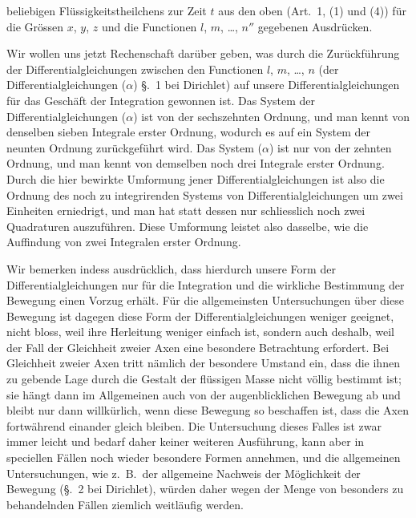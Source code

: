 \documentclass[12pt,a4paper]{article}
\begin{document}
beliebigen Fl\"ussigkeitstheilchens zur Zeit $t$ aus den oben (Art.~1, (1) und (4)) f\"ur die Gr\"ossen $x$, $y$, $z$ und die Functionen $l$, $m$, \dots, $n''$ gegebenen Ausdr\"ucken.

Wir wollen uns jetzt Rechenschaft dar\"uber geben, was durch die Zur\"uckf\"uhrung der Differentialgleichungen zwischen den Functionen $l$, $m$, \dots, $n$ (der Differentialgleichungen ($\alpha$) \S.~1 bei Dirichlet) auf unsere Differentialgleichungen f\"ur das Gesch\"aft der Integration gewonnen ist. Das System der Differentialgleichungen ($\alpha$) ist von der sechszehnten Ordnung, und man kennt von denselben sieben Integrale erster Ordnung, wodurch es auf ein System der neunten Ordnung zur\"uckgef\"uhrt wird. Das System ($\alpha$) ist nur von der zehnten Ordnung, und man kennt von demselben noch drei Integrale erster Ordnung. Durch die hier bewirkte Umformung jener Differentialgleichungen ist also die Ordnung des noch zu integrirenden Systems von Differentialgleichungen um zwei Einheiten erniedrigt, und man hat statt dessen nur schliesslich noch zwei Quadraturen auszuf\"uhren. Diese Umformung leistet also dasselbe, wie die Auffindung von zwei Integralen erster Ordnung.

Wir bemerken indess ausdr\"ucklich, dass hierdurch unsere Form der Differentialgleichungen nur f\"ur die Integration und die wirkliche Bestimmung der Bewegung einen Vorzug erh\"alt. F\"ur die allgemeinsten Untersuchungen \"uber diese Bewegung ist dagegen diese Form der Differentialgleichungen weniger geeignet, nicht bloss, weil ihre Herleitung weniger einfach ist, sondern auch deshalb, weil der Fall der Gleichheit zweier Axen eine besondere Betrachtung erfordert. Bei Gleichheit zweier Axen tritt n\"amlich der besondere Umstand ein, dass die ihnen zu gebende Lage durch die Gestalt der fl\"ussigen Masse nicht v\"ollig bestimmt ist; sie h\"angt dann im Allgemeinen auch von der augenblicklichen Bewegung ab und bleibt nur dann willk\"urlich, wenn diese Bewegung so beschaffen ist, dass die Axen fortw\"ahrend einander gleich bleiben. Die Untersuchung dieses Falles ist zwar immer leicht und bedarf daher keiner weiteren Ausf\"uhrung, kann aber in speciellen F\"allen noch wieder besondere Formen annehmen, und die allgemeinen Untersuchungen, wie z.~B.~der allgemeine Nachweis der M\"oglichkeit der Bewegung (\S.~2 bei Dirichlet), w\"urden daher wegen der Menge von besonders zu behandelnden F\"allen ziemlich weitl\"aufig werden.
\end{document}
